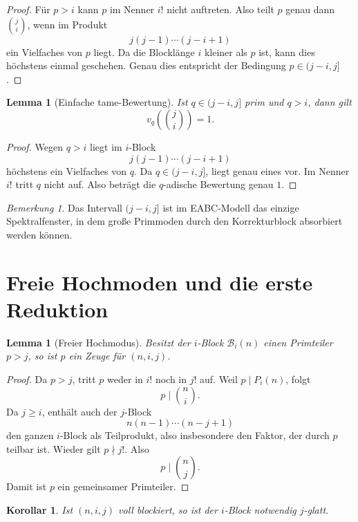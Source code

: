 \documentclass[12pt,a4paper]{article}
\theoremstyle{plain}
\newtheorem{lemma}[theorem]{Lemma}
\newtheorem{corollary}[theorem]{Korollar}
\theoremstyle{definition}
\theoremstyle{remark}
\newtheorem{remark}[theorem]{Bemerkung}
\begin{document}
	\begin{proof}
		Für \(p>i\) kann \(p\) im Nenner \(i!\) nicht auftreten. Also teilt \(p\) genau dann \(\binom{j}{i}\), wenn im Produkt
		\[
		j(j-1)\cdots (j-i+1)
		\]
		ein Vielfaches von \(p\) liegt. Da die Blocklänge \(i\) kleiner als \(p\) ist, kann dies höchstens einmal geschehen. Genau dies entspricht der Bedingung \(p\in(j-i,j]\).
	\end{proof}
	
	\begin{lemma}[Einfache tame-Bewertung]
		\label{lem:tame-eins}
		Ist \(q\in(j-i,j]\) prim und \(q>i\), dann gilt
		\[
		v_q\!\left(\binom{j}{i}\right)=1.
		\]
	\end{lemma}
	
	\begin{proof}
		Wegen \(q>i\) liegt im \(i\)-Block
		\[
		j(j-1)\cdots(j-i+1)
		\]
		höchstens ein Vielfaches von \(q\). Da \(q\in(j-i,j]\), liegt genau eines vor. Im Nenner \(i!\) tritt \(q\) nicht auf. Also beträgt die \(q\)-adische Bewertung genau \(1\).
	\end{proof}
	
	\begin{remark}
		Das Intervall \((j-i,j]\) ist im EABC-Modell das einzige Spektralfenster, in dem große Primmoden durch den Korrekturblock absorbiert werden können.
	\end{remark}
	
	\section{Freie Hochmoden und die erste Reduktion}
	
	\begin{lemma}[Freier Hochmodus]
		\label{lem:freier-hochmodus}
		Besitzt der \(i\)-Block \(\mathcal B_i(n)\) einen Primteiler \(p>j\), so ist \(p\) ein Zeuge für \((n,i,j)\).
	\end{lemma}
	
	\begin{proof}
		Da \(p>j\), tritt \(p\) weder in \(i!\) noch in \(j!\) auf. Weil \(p\mid P_i(n)\), folgt
		\[
		p\mid \binom{n}{i}.
		\]
		Da \(j\ge i\), enthält auch der \(j\)-Block
		\[
		n(n-1)\cdots(n-j+1)
		\]
		den ganzen \(i\)-Block als Teilprodukt, also insbesondere den Faktor, der durch \(p\) teilbar ist. Wieder gilt \(p\nmid j!\). Also
		\[
		p\mid \binom{n}{j}.
		\]
		Damit ist \(p\) ein gemeinsamer Primteiler.
	\end{proof}
	
	\begin{corollary}
		Ist \((n,i,j)\) voll blockiert, so ist der \(i\)-Block notwendig \(j\)-glatt.
	\end{corollary}
	
\end{document}
